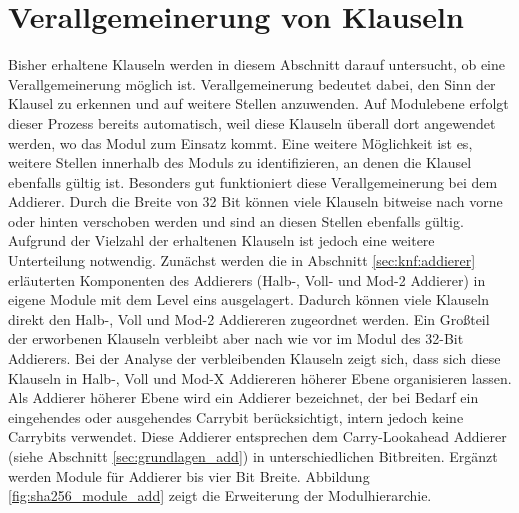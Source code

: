 \section{Verallgemeinerung von Klauseln}
\label{sec:ana:generalize}

Bisher erhaltene Klauseln werden in diesem Abschnitt darauf untersucht, ob eine Verallgemeinerung möglich ist. Verallgemeinerung bedeutet dabei, den Sinn der Klausel
zu erkennen und auf weitere Stellen anzuwenden. Auf Modulebene erfolgt dieser Prozess bereits automatisch, weil diese Klauseln überall dort angewendet werden, wo das
Modul zum Einsatz kommt. Eine weitere Möglichkeit ist es, weitere Stellen innerhalb des Moduls zu identifizieren, an denen die Klausel ebenfalls gültig ist. Besonders
gut funktioniert diese Verallgemeinerung bei dem Addierer. Durch die Breite von 32 Bit können viele Klauseln bitweise nach vorne oder hinten verschoben werden und sind
an diesen Stellen ebenfalls gültig. Aufgrund der Vielzahl der erhaltenen Klauseln ist jedoch eine weitere Unterteilung notwendig. Zunächst werden die in Abschnitt
\ref{sec:knf:addierer} erläuterten Komponenten des Addierers (Halb-, Voll- und Mod-2 Addierer) in eigene Module mit dem Level eins ausgelagert. Dadurch können viele
Klauseln direkt den Halb-, Voll und Mod-2 Addiereren zugeordnet werden. Ein Großteil der erworbenen Klauseln verbleibt aber nach wie vor im Modul des 32-Bit Addierers.
Bei der Analyse der verbleibenden Klauseln zeigt sich, dass sich diese Klauseln in Halb-, Voll und Mod-X Addiereren höherer Ebene organisieren lassen. Als Addierer
höherer Ebene wird ein Addierer bezeichnet, der bei Bedarf ein eingehendes oder ausgehendes Carrybit berücksichtigt, intern jedoch keine Carrybits verwendet. Diese
Addierer entsprechen dem Carry-Lookahead Addierer (siehe Abschnitt \ref{sec:grundlagen_add}) in unterschiedlichen Bitbreiten. Ergänzt werden Module für Addierer bis
vier Bit Breite. Abbildung \ref{fig:sha256_module_add} zeigt die Erweiterung der Modulhierarchie.
